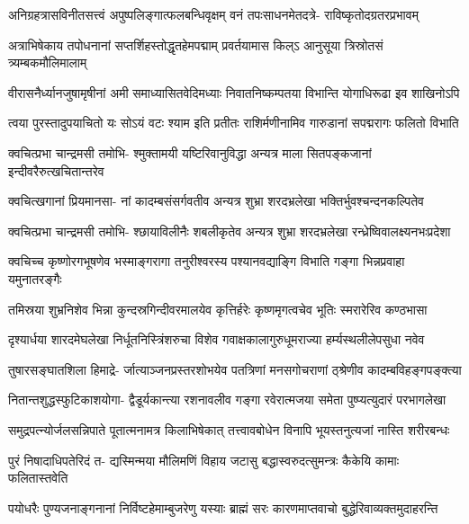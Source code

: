 \fourlineindentedshloka
{अनिग्रहत्रासविनीतसत्त्वं}
{अपुष्पलिङ्गात्फलबन्धिवृक्षम्}
{वनं तपःसाधनमेतदत्रे-}
{राविष्कृतोदग्रतरप्रभावम्} %

\twolineshloka
{अत्राभिषेकाय तपोधनानां सप्तर्शिहस्तोद्धृतहेमपद्माम्}
{प्रवर्तयामास किल्ऽ आनुसूया त्रिस्रोतसं त्र्यम्बकमौलिमालाम्} %

\fourlineindentedshloka
{वीरासनैर्ध्यानजुषामृषीनां}
{अमी समाध्यासितवेदिमध्याः}
{निवातनिष्कम्पतया विभान्ति}
{योगाधिरूढा इव शाखिनोऽपि} %

\fourlineindentedshloka
{त्वया पुरस्तादुपयाचितो यः}
{सोऽयं वटः श्याम इति प्रतीतः}
{राशिर्मणीनामिव गारुडानां}
{सपद्मरागः फलितो विभाति} %

\fourlineindentedshloka
{क्वचित्प्रभा चान्द्रमसी तमोभि-}
{श्मुक्तामयी यष्टिरिवानुविद्धा}
{अन्यत्र माला सितपङ्कजानां}
{इन्दीवरैरुत्खचितान्तरेव} %

\fourlineindentedshloka
{क्वचित्खगानां प्रियमानसा-}
{नां कादम्बसंसर्गवतीव}
{अन्यत्र शुभ्रा शरदभ्रलेखा}
{भक्तिर्भुवश्चन्दनकल्पितेव} %

\fourlineindentedshloka
{क्वचित्प्रभा चान्द्रमसी तमोभि-}
{श्छायाविलीनैः शबलीकृतेव}
{अन्यत्र शुभ्रा शरदभ्रलेखा}
{रन्ध्रेष्विवालक्ष्यनभःप्रदेशा} %

\fourlineindentedshloka
{क्वचिच्च कृष्णोरगभूषणेव}
{भस्माङ्गरागा तनुरीश्वरस्य}
{पश्यानवद्याङ्गि विभाति गङ्गा}
{भिन्नप्रवाहा यमुनातरङ्गैः} %

\fourlineindentedshloka
{तमिस्रया शुभ्रनिशेव भिन्ना}
{कुन्दस्रगिन्दीवरमालयेव}
{कृत्तिर्हरेः कृष्णमृगत्वचेव}
{भूतिः स्मरारेरिव कण्ठभासा} %

\fourlineindentedshloka
{दृश्यार्धया शारदमेघलेखा}
{निर्धूतनिस्त्रिंशरुचा विशेव}
{गवाक्षकालागुरुधूमराज्या}
{हर्म्यस्थलीलेपसुधा नवेव} %

\fourlineindentedshloka
{तुषारसङ्घातशिला हिमाद्रे-}
{र्जात्याञ्जनप्रस्तरशोभयेव}
{पतत्रिणां मनसगोचराणां}
{ठ्श्रेणीव कादम्बविहङ्गपङ्क्त्या} %

\fourlineindentedshloka
{नितान्तशुद्धस्फुटिकाशयोगा-}
{द्वैडूर्यकान्त्या रशनावलीव}
{गङ्गा रवेरात्मजया समेता}
{पुष्प्यत्युदारं परभागलेखा} %

\twolineshloka
{समुद्रपत्न्योर्जलसन्निपाते पूतात्मनामत्र किलाभिषेकात्}
{तत्त्वावबोधेन विनापि भूयस्तनुत्यजां नास्ति शरीरबन्धः} %

\fourlineindentedshloka
{पुरं निषादाधिपतेरिदं त-}
{द्यस्मिन्मया मौलिमणिं विहाय}
{जटासु बद्धास्वरुदत्सुमन्त्रः}
{कैकेयि कामाः फलितास्तवेति} %

\fourlineindentedshloka
{पयोधरैः पुण्यजनाङ्गनानां}
{निर्विष्टहेमाम्बुजरेणु यस्याः}
{ब्राह्मं सरः कारणमाप्तवाचो}
{बुद्धेरिवाव्यक्तमुदाहरन्ति} %

